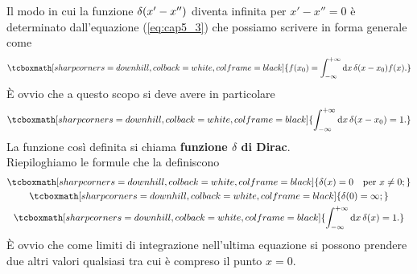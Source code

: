 \documentclass[a4paper,12pt,oneside]{book}
\begin{document}
Il modo in cui la funzione $\delta\qty(x'-x'')$ diventa infinita per $x'-x''=0$ è determinato dall'equazione (\ref{eq:cap5_3}) che possiamo scrivere in forma generale come
	\begin{equation}
		\tcboxmath[sharp corners=downhill, colback=white, colframe=black]{
			f\qty(x_0) = \int_{-\infty}^{+\infty}\dd{x}\delta\qty(x-x_0)f\qty(x) .
			}
	\end{equation}
È ovvio che a questo scopo si deve avere in particolare
	\begin{equation}
		\tcboxmath[sharp corners=downhill, colback=white, colframe=black]{
			\int_{-\infty}^{+\infty}\dd{x}\delta\qty(x-x_0) = 1 .
			}
	\end{equation}
La funzione così definita si chiama \textbf{funzione $\delta$ di Dirac}.\\

Riepiloghiamo le formule che la definiscono
\begin{gather}
  \tcboxmath[sharp corners=downhill, colback=white, colframe=black]{
  	\delta(x) = 0 \quad \text{per }x\neq 0 ;
  		}\\
 \tcboxmath[sharp corners=downhill, colback=white, colframe=black]{
 	\delta(0) = \infty ;}
 	\\
 \tcboxmath[sharp corners=downhill, colback=white, colframe=black]{
 	\int_{-\infty}^{+\infty}\dd{x}\delta(x)=1 .
 	}
\end{gather}
È ovvio che come limiti di integrazione nell'ultima equazione si possono prendere due altri valori qualsiasi tra cui è compreso il punto $x=0$.\\
\end{document}
